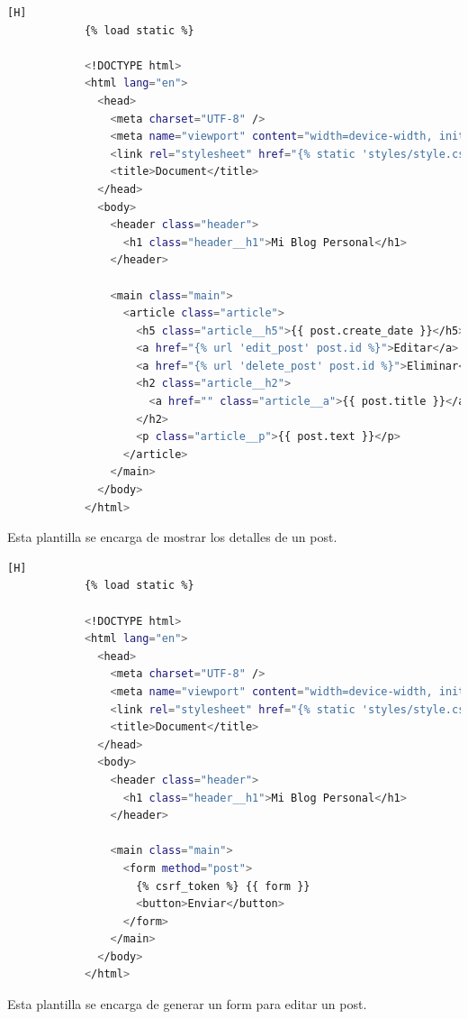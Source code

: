 \documentclass{article}
\begin{document}
        \begin{lstlisting}[language=bash,caption={post.html}][H]
            {% load static %}

            <!DOCTYPE html>
            <html lang="en">
              <head>
                <meta charset="UTF-8" />
                <meta name="viewport" content="width=device-width, initial-scale=1.0" />
                <link rel="stylesheet" href="{% static 'styles/style.css' %}" />
                <title>Document</title>
              </head>
              <body>
                <header class="header">
                  <h1 class="header__h1">Mi Blog Personal</h1>
                </header>
            
                <main class="main">
                  <article class="article">
                    <h5 class="article__h5">{{ post.create_date }}</h5>
                    <a href="{% url 'edit_post' post.id %}">Editar</a>
                    <a href="{% url 'delete_post' post.id %}">Eliminar</a>
                    <h2 class="article__h2">
                      <a href="" class="article__a">{{ post.title }}</a>
                    </h2>
                    <p class="article__p">{{ post.text }}</p>
                  </article>
                </main>
              </body>
            </html>
	\end{lstlisting}
         Esta plantilla se encarga de mostrar los detalles de un post.

         \begin{lstlisting}[language=bash,caption={editPost.html}][H]
            {% load static %}

            <!DOCTYPE html>
            <html lang="en">
              <head>
                <meta charset="UTF-8" />
                <meta name="viewport" content="width=device-width, initial-scale=1.0" />
                <link rel="stylesheet" href="{% static 'styles/style.css' %}" />
                <title>Document</title>
              </head>
              <body>
                <header class="header">
                  <h1 class="header__h1">Mi Blog Personal</h1>
                </header>
            
                <main class="main">
                  <form method="post">
                    {% csrf_token %} {{ form }}
                    <button>Enviar</button>
                  </form>
                </main>
              </body>
            </html>
	\end{lstlisting}
        Esta plantilla se encarga de generar un form para editar un post.
\end{document}
